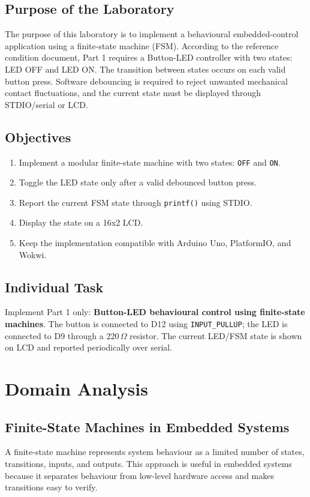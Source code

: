 \documentclass[12pt]{article}
\begin{document}
\subsection*{Purpose of the Laboratory}
\hspace{0.8cm} The purpose of this laboratory is to implement a behavioural embedded-control application using a finite-state machine (FSM). According to the reference condition document, Part 1 requires a Button-LED controller with two states: LED OFF and LED ON. The transition between states occurs on each valid button press. Software debouncing is required to reject unwanted mechanical contact fluctuations, and the current state must be displayed through STDIO/serial or LCD.

\subsection*{Objectives}
\begin{enumerate}
    \item Implement a modular finite-state machine with two states: \texttt{OFF} and \texttt{ON}.
    \item Toggle the LED state only after a valid debounced button press.
    \item Report the current FSM state through \texttt{printf()} using STDIO.
    \item Display the state on a 16x2 LCD.
    \item Keep the implementation compatible with Arduino Uno, PlatformIO, and Wokwi.
\end{enumerate}

\subsection*{Individual Task}
\hspace{0.8cm} Implement Part 1 only: \textbf{Button-LED behavioural control using finite-state machines}. The button is connected to D12 using \texttt{INPUT\_PULLUP}; the LED is connected to D9 through a 220\,$\Omega$ resistor. The current LED/FSM state is shown on LCD and reported periodically over serial.

\section{Domain Analysis}

\subsection{Finite-State Machines in Embedded Systems}
\hspace{0.8cm} A finite-state machine represents system behaviour as a limited number of states, transitions, inputs, and outputs. This approach is useful in embedded systems because it separates behaviour from low-level hardware access and makes transitions easy to verify.
\end{document}
